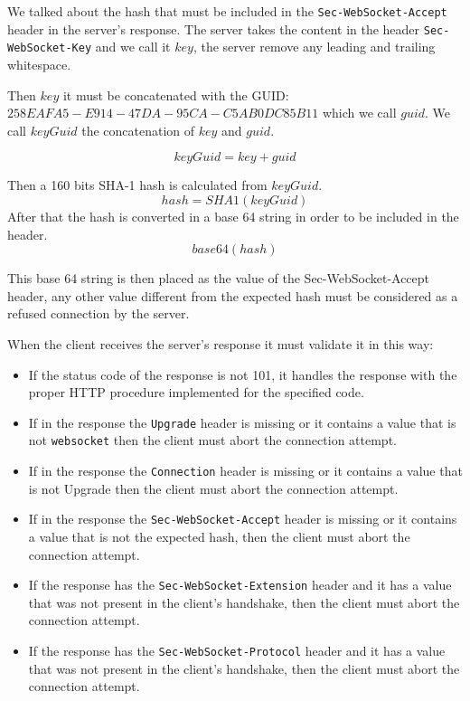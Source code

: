 We talked about the hash that must be included in the \texttt{Sec-WebSocket-Accept} header in the server’s response.\newline
The server takes the content in the header \texttt{Sec-WebSocket-Key} and we call it $key$, the server remove any leading and trailing whitespace.\newline

Then $key$ it must be concatenated with the GUID:
$258EAFA5-E914-47DA-95CA-C5AB0DC85B11$ which we call $guid$.
We call $keyGuid$ the concatenation of $key$ and $guid$.

\begin{equation}
	keyGuid=key+guid
\end{equation}

Then a 160 bits SHA-1 hash is calculated from $keyGuid$.
\begin{equation}
	hash=SHA1(keyGuid)
\end{equation}
After that the hash is converted in a base 64 string in order to be included in the header.
\begin{equation}
	base64(hash)
\end{equation}

This base 64 string is then placed as the value of the Sec-WebSocket-Accept header, any other value different from the expected hash must be considered as a refused connection by the server.\newline

When the client receives the server’s response it must validate it in this way:
\begin{itemize}
	\item If the status code of the response is not 101, it handles the response with the proper HTTP procedure implemented for the specified code.
	\item If in the response the \texttt{Upgrade} header is missing or it contains a value that is not \texttt{websocket} then the client must abort the connection attempt.
	\item If in the response the \texttt{Connection} header is missing or it contains a value that is not Upgrade then the client must abort the connection attempt.
	\item If in the response the \texttt{Sec-WebSocket-Accept} header is missing or it contains a value that is not the expected hash, then the client must abort the connection attempt.
	\item If the response has the \texttt{Sec-WebSocket-Extension} header and it has a value that was not present in the client’s handshake, then the client must abort the connection attempt.
	\item If the response has the \texttt{Sec-WebSocket-Protocol} header and it has a value that was not present in the client’s handshake, then the client must abort the connection attempt.
\end{itemize}

